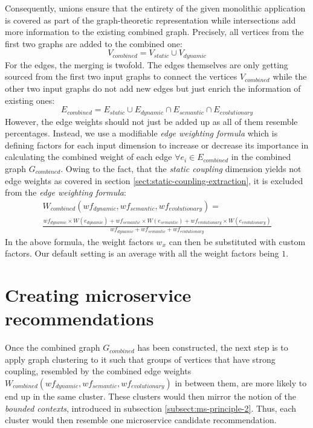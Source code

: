 \documentclass[12pt,a4paper]{report}
\begin{document}
Consequently, unions ensure that the entirety of the given
monolithic application is covered as part of the graph-theoretic representation
while intersections add more information to the existing combined graph.
Precisely, all vertices from the first two graphs are added to the combined one:
\[
  V_{combined} = V_{static} \cup V_{dynamic}
\]
For the edges, the merging is twofold. The edges themselves are only getting
sourced from the first two input graphs to connect the vertices \(V_{combined}\)
while the other two input graphs do not add new edges but just enrich the
information of existing ones:
\[
  E_{combined} = E_{static} \cup E_{dynamic} \cap E_{semantic} \cap E_{evolutionary}
\]
However, the edge weights should not just be added up as all of them resemble
percentages. Instead, we use a modifiable \textit{edge weighting formula} which
is defining factors for each input dimension to increase or decrease its importance
in calculating the combined weight of each edge \(\forall e_i \in E_{combined}\)
in the combined graph \(G_{combined}\). Owing to the fact, that the
\textit{static coupling} dimension yields not edge weights as covered in section
\ref{sect:static-coupling-extraction}, it is excluded from
the \textit{edge weighting formula}:
\small
\begin{equation*}
\begin{split}
  W_{combined}(wf_{dynamic}, wf_{semantic}, wf_{evolutionary}) = \\
  \frac{
    wf_{dynamic} \times W(e_{dynamic}) +
    wf_{semantic} \times W(e_{semantic}) +
    wf_{evolutionary} \times W(e_{evolutionary})
  }{
    wf_{dynamic} +
    wf_{semantic} +
    wf_{evolutionary}
  }
\end{split}
\end{equation*}
\normalsize
In the above formula, the weight factors \(w_x\) can then be substituted
with custom factors. Our default setting is an average with all the
weight factors being \(1\).




\chapter{Creating microservice recommendations} \label{chap:creating-service-recommendations}

Once the combined graph \(G_{combined}\) has been constructed, the next step is
to apply graph clustering to it such that groups of vertices that have strong
coupling, resembled by the combined edge weights
\(W_{combined}(wf_{dynamic}, wf_{semantic}, wf_{evolutionary})\) in between them,
are more likely to end up in the same cluster.
These clusters would then mirror the notion of the \textit{bounded contexts},
introduced in subsection \ref{subsect:ms-principle-2}.
Thus, each cluster would then resemble one microservice candidate recommendation.
\end{document}
